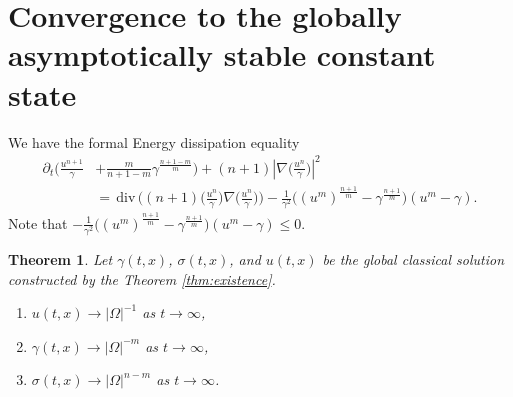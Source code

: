 \documentclass[a4paper,11pt]{article}
\def\div{\,\textrm{div}\,}
\newtheorem{theorem}{Theorem}
\theoremstyle{remark}
\begin{document}
\section{Convergence to the globally asymptotically stable constant state}
We have the formal Energy dissipation equality
\begin{align}
 \partial_t\Big( \frac{u^{n+1}}{\gamma} &+ \frac{m}{n+1-m}\gamma^{\frac{n+1-m}{m}}\Big) + (n+1) \left|\nabla \big(\frac{u^n}{\gamma}\big)\right|^2 \nonumber \\
 &= \div \Big( (n+1)\big(\frac{u^n}{\gamma}\big)\nabla \big(\frac{u^n}{\gamma}\big)\Big) - \frac{1}{\gamma^2}\Big( (u^m)^{\frac{n+1}{m}} - \gamma^{\frac{n+1}{m}}\Big)(u^m-\gamma). \label{eq:energy}
\end{align}
Note that $\displaystyle - \frac{1}{\gamma^2}\Big( (u^m)^{\frac{n+1}{m}} - \gamma^{\frac{n+1}{m}}\Big)(u^m-\gamma)\le0$.
\begin{theorem} Let $\gamma(t,x)$, $\sigma(t,x)$, and $u(t,x)$ be the global classical solution constructed by the Theorem \ref{thm:existence}.
 \begin{enumerate}
  \item $u(t,x) \rightarrow |\Omega|^{-1}$ as $t \rightarrow \infty$, %
  \item $\gamma(t,x) \rightarrow |\Omega|^{-m}$ as $t \rightarrow \infty$,
  \item $\sigma(t,x) \rightarrow |\Omega|^{n-m}$ as $t \rightarrow \infty$.
 \end{enumerate}
\end{theorem}
\end{document}
